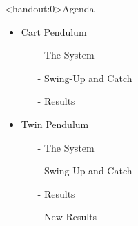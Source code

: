 \begin{frame}<handout:0>{Agenda}{}
  \begin{itemize}
    \item Cart Pendulum
    \begin{itemize}
      \item[-] The System
      \item[-] Swing-Up and Catch
      \item[-] Results
    \end{itemize}
    \item[]
    \item Twin Pendulum
    \begin{itemize}
      \item[-] The System
      \item[-] Swing-Up and Catch
      \item[-] Results
      \item[-] New Results
    \end{itemize}
  \end{itemize}
\end{frame}